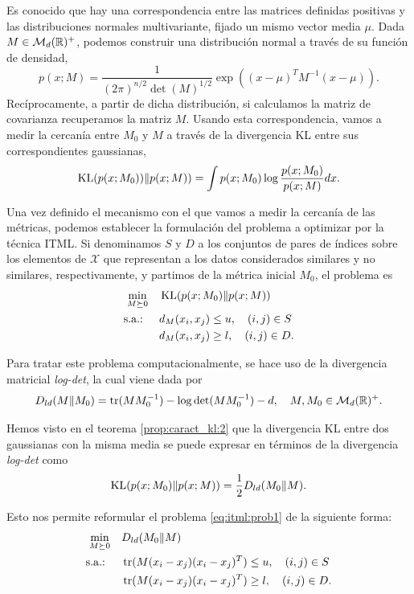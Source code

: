 Es conocido que hay una correspondencia entre las matrices definidas positivas y las distribuciones normales multivariante, fijado un mismo vector media $\mu$. Dada $M \in \mathcal{M}_d(\mathbb{R})^+$, podemos construir una distribución normal a través de su función de densidad,
\[ p(x;M) = \frac{1}{(2\pi)^{n/2}\det(M)^{1/2}}\exp\left( (x-\mu)^TM^{-1}(x-\mu) \right). \]
Recíprocamente, a partir de dicha distribución, si calculamos la matriz de covarianza recuperamos la matriz $M$. Usando esta correspondencia, vamos a medir la cercanía entre $M_0$ y $M$ a través de la divergencia KL entre sus correspondientes gaussianas,
\[ \operatorname{KL}(p(x;M_0))\|p(x;M)) = \int p(x;M_0)\log\frac{p(x;M_0)}{p(x;M)}dx. \]

Una vez definido el mecanismo con el que vamos a medir la cercanía de las métricas, podemos establecer la formulación del problema a optimizar por la técnica ITML. Si denominamos $S$ y $D$ a los conjuntos de pares de índices sobre los elementos de $\mathcal{X}$ que representan a los datos considerados similares y no similares, respectivamente, y partimos de la métrica inicial $M_0$, el problema es
\begin{equation} \label{eq:itml:prob1}
    \begin{split}
    \min_{M \succeq 0} &\quad \operatorname{KL}(p(x;M_0)\|p(x;M))  \\
    \text{s.a.: } &\quad d_M(x_i,x_j) \le u, \quad (i,j) \in S \\
                  &\quad d_M(x_i,x_j) \ge l, \quad (i,j) \in D.
    \end{split}
\end{equation}

Para tratar este problema computacionalmente, se hace uso de la divergencia matricial \emph{log-det}, la cual viene dada por
\[ D_{ld}(M\|M_0) = \operatorname{tr}(MM_0^{-1}) - \log\det(MM_0^{-1}) -d, \quad M,M_0 \in \mathcal{M}_d(\mathbb{R})^+. \]

Hemos visto en el teorema \ref{prop:caract_kl:2} que la divergencia KL entre dos gaussianas con la misma media se puede expresar en términos de la divergencia \emph{log-det} como
\[ \operatorname{KL}(p(x;M_0)\|p(x;M)) = \frac{1}{2}D_{ld}(M_0\|M). \]

Esto nos permite reformular el problema \ref{eq:itml:prob1} de la siguiente forma:
\begin{equation} \label{eq:itml:prob2}
    \begin{split}
    \min_{M \succeq 0} &\quad D_{ld}(M_0\|M)  \\
    \text{s.a.: } &\quad \operatorname{tr}(M(x_i-x_j)(x_i-x_j)^T) \le u, \quad (i,j) \in S \\
                  &\quad \operatorname{tr}(M(x_i-x_j)(x_i-x_j)^T) \ge l, \quad (i,j) \in D.
    \end{split}
\end{equation}

